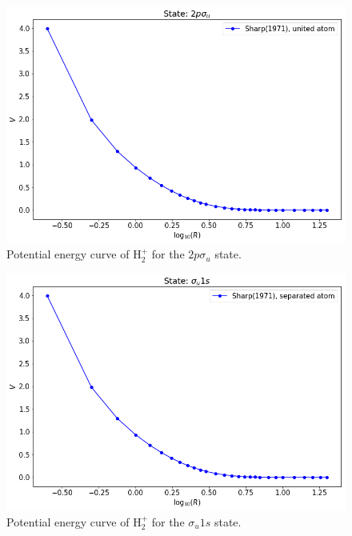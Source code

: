 \documentclass[12pt]{article}
\begin{document}
\begin{figure}[h]
    \centering
    \includegraphics[scale=0.5]{img/H2plus_2psigmau_Sharp(1971).png}
    \caption{Potential energy curve of H$_2^+$ for the $2p \sigma_u$ state.}
    \label{fig:h2+3}
\end{figure}
\begin{figure}[h]
    \centering
    \includegraphics[scale=0.5]{img/H2plus_sigmau1s_Sharp(1971).png}
    \caption{Potential energy curve of H$_2^+$ for the $\sigma_u 1s$ state.}
    \label{fig:h2+4}
\end{figure}
\fi %
\end{document}
